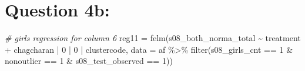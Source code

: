\documentclass[
]{article}
\newenvironment{Shaded}{\begin{snugshade}}{\end{snugshade}}
\newcommand{\AttributeTok}[1]{\textcolor[rgb]{0.77,0.63,0.00}{#1}}
\newcommand{\CommentTok}[1]{\textcolor[rgb]{0.56,0.35,0.01}{\textit{#1}}}
\newcommand{\DecValTok}[1]{\textcolor[rgb]{0.00,0.00,0.81}{#1}}
\newcommand{\FunctionTok}[1]{\textcolor[rgb]{0.00,0.00,0.00}{#1}}
\newcommand{\NormalTok}[1]{#1}
\newcommand{\OtherTok}[1]{\textcolor[rgb]{0.56,0.35,0.01}{#1}}
\newcommand{\SpecialCharTok}[1]{\textcolor[rgb]{0.00,0.00,0.00}{#1}}
\begin{document}
\hypertarget{question-4b}{%
\section{Question 4b:}\label{question-4b}}

\begin{Shaded}
\begin{Highlighting}[]
\CommentTok{\# girls regression for column 6}
\NormalTok{reg11 }\OtherTok{=} \FunctionTok{felm}\NormalTok{(s08\_both\_norma\_total }\SpecialCharTok{\textasciitilde{}}\NormalTok{ treatment }\SpecialCharTok{+}\NormalTok{ chagcharan }\SpecialCharTok{|} \DecValTok{0} \SpecialCharTok{|} \DecValTok{0} \SpecialCharTok{|}\NormalTok{ clustercode, }
            \AttributeTok{data =}\NormalTok{ af }\SpecialCharTok{\%\textgreater{}\%} \FunctionTok{filter}\NormalTok{(s08\_girls\_cnt }\SpecialCharTok{==} \DecValTok{1} \SpecialCharTok{\&} 
\NormalTok{                                 nonoutlier }\SpecialCharTok{==} \DecValTok{1} \SpecialCharTok{\&}
\NormalTok{                                 s08\_test\_observed }\SpecialCharTok{==} \DecValTok{1}\NormalTok{))}


\end{Highlighting}
\end{Shaded}
\end{document}
